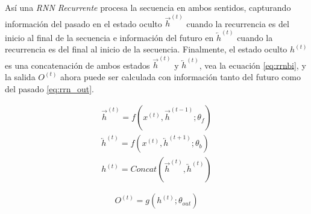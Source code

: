Así una \textit{RNN Recurrente}  procesa la secuencia en ambos sentidos, capturando información del
pasado en el estado oculto $\overrightarrow{h}^{(t)}$  cuando la recurrencia es del inicio al final
de la secuencia e información del futuro en $\overleftarrow{h}  ^{(t)}$ cuando la recurrencia es del
final al inicio de la secuencia. Finalmente, el estado oculto $h^{(t)}$ es una concatenación de ambos
estados $\overrightarrow{h}^{(t)}$ y $\overleftarrow{h}^{(t)}$, vea la ecuación \ref{eq:rrnbi},
y la salida $O^{(t)}$ ahora puede ser calculada con información tanto del futuro como del pasado
\ref{eq:rrn_out}.

\begin{equation}
\begin{split}
    \overrightarrow{h}^{(t)} = f(x^{(t)}, \overrightarrow{h}^{(t-1)}; \theta_f)\\
    \overleftarrow{h}^{(t)} = f(x^{(t)}, \overleftarrow{h}^{(t+1)}; \theta_b)\\
    h^{(t)} = Concat(\overrightarrow{h}^{(t)}, \overleftarrow{h}^{(t)})
\end{split}
\label{eq:rrnbi}
\end{equation}

\begin{equation}
        O^{(t)} = g(h^{(t)}; \theta_{out})
\label{eq:rrn_out}
\end{equation}
